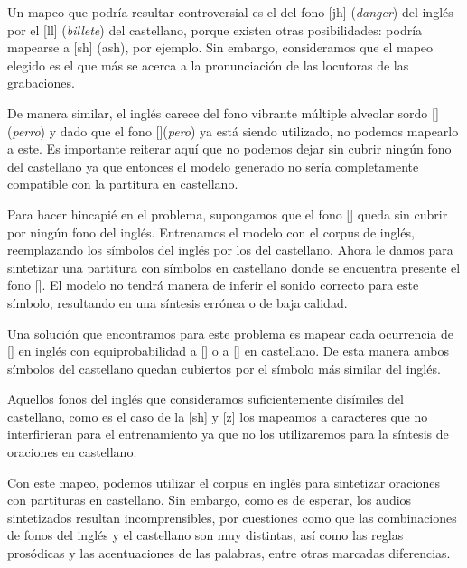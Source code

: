Un mapeo que podría resultar controversial es el del fono [jh] (\textit{danger}) del inglés por el [ll] (\textit{billete}) del castellano, porque existen otras posibilidades: podría mapearse a [sh] (ash), por ejemplo. Sin embargo, consideramos que el mapeo elegido es el que más se acerca a la pronunciación de las locutoras de las grabaciones.

De manera similar, el inglés carece del fono vibrante múltiple alveolar sordo [] (\textit{perro}) y dado que el fono [](\textit{pero})  ya está siendo utilizado, no podemos mapearlo a este. Es importante reiterar aquí que no podemos dejar sin cubrir ningún fono del castellano ya que entonces el modelo generado no sería completamente compatible con la partitura en castellano. 

Para hacer hincapié en el problema, supongamos que el fono [] queda sin cubrir por ningún fono del inglés. Entrenamos el modelo con el corpus de inglés, reemplazando los símbolos del inglés por los del castellano. Ahora le damos para sintetizar una partitura con símbolos en castellano donde se encuentra presente el fono []. El modelo no tendrá manera de inferir el sonido correcto para este símbolo, resultando en una síntesis errónea o de baja calidad. 

Una solución que encontramos para este problema es mapear cada ocurrencia de [] en inglés con equiprobabilidad a [] o a [] en castellano. De esta manera ambos símbolos del castellano quedan cubiertos por el símbolo más similar del inglés.

Aquellos fonos del inglés que consideramos suficientemente disímiles del castellano, como es el caso de la [sh] y [z] los mapeamos a caracteres que no interfirieran para el entrenamiento ya que no los utilizaremos para la síntesis de oraciones en castellano.

Con este mapeo, podemos utilizar el corpus en inglés para sintetizar oraciones con partituras en castellano. Sin embargo, como es de esperar, los audios sintetizados resultan incomprensibles, por cuestiones como que las combinaciones de fonos del inglés y el castellano son muy distintas, así como las reglas prosódicas y las acentuaciones de las palabras, entre otras marcadas diferencias.


